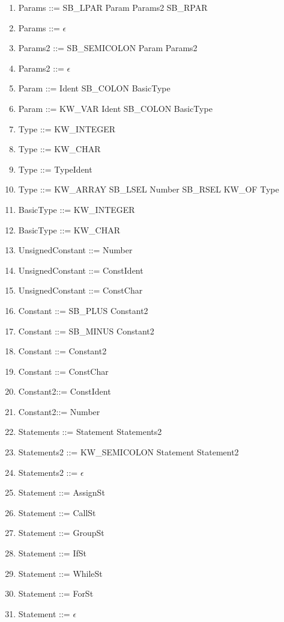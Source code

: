 \documentclass[12pt, a4paper]{report}
\begin{document}
\begin{enumerate}
					\item Params ::= SB\_LPAR Param Params2 SB\_RPAR
					\item Params ::= $\epsilon$

					\item Params2 ::= SB\_SEMICOLON Param Params2
					\item Params2 ::= $\epsilon$

					\item Param ::= Ident SB\_COLON BasicType
					\item Param ::= KW\_VAR Ident SB\_COLON BasicType
					\item Type ::= KW\_INTEGER 
					\item Type ::= KW\_CHAR 
					\item Type ::= TypeIdent 
					\item Type ::= KW\_ARRAY SB\_LSEL Number SB\_RSEL KW\_OF Type

					\item BasicType ::= KW\_INTEGER 
					\item BasicType ::= KW\_CHAR

					\item UnsignedConstant ::= Number
					\item UnsignedConstant ::= ConstIdent
					\item UnsignedConstant ::= ConstChar

					\item Constant ::= SB\_PLUS Constant2
					\item Constant ::= SB\_MINUS Constant2 
					\item Constant ::= Constant2 
					\item Constant ::= ConstChar

					\item Constant2::= ConstIdent
					\item Constant2::= Number

					\item Statements ::= Statement Statements2

					\item Statements2 ::= KW\_SEMICOLON Statement Statement2
					\item Statements2 ::= $\epsilon$

					\item Statement ::= AssignSt
					\item Statement ::= CallSt
					\item Statement ::= GroupSt
					\item Statement ::= IfSt
					\item Statement ::= WhileSt
					\item Statement ::= ForSt
					\item Statement ::= $\epsilon$ 


\end{enumerate}
\end{document}
